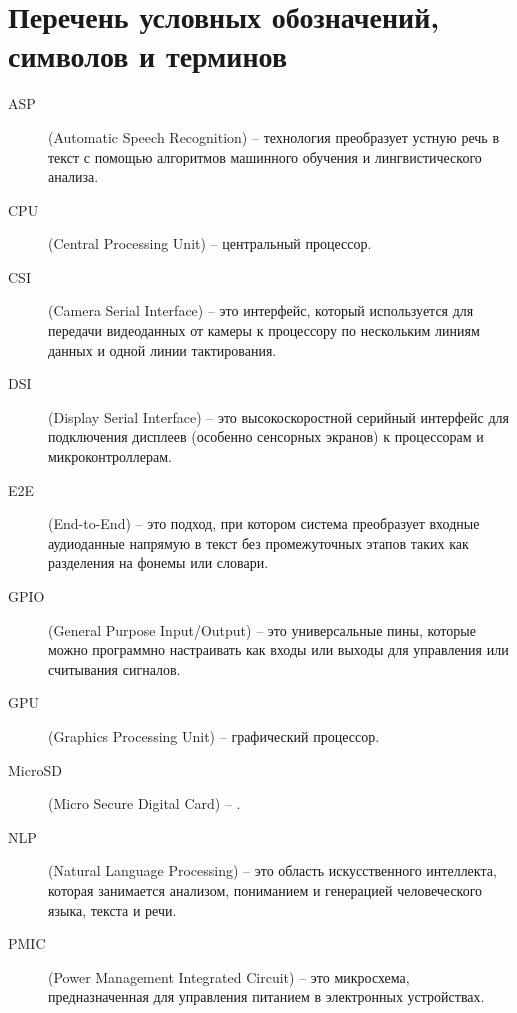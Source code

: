 \section*{Перечень условных обозначений, символов и терминов}




\begin{description}
	\item[\normalfont ASP] (Automatic Speech Recognition) -- технология преобразует устную речь в текст с помощью алгоритмов машинного обучения и лингвистического анализа.
	
	\item[\normalfont CPU] (Central Processing Unit) -- центральный процессор.
	
	\item[\normalfont CSI] (Camera Serial Interface) -- это интерфейс, который используется для передачи видеоданных от камеры к процессору по нескольким линиям данных и одной линии тактирования.
	
	\item[\normalfont DSI] (Display Serial Interface) -- это высокоскоростной серийный интерфейс для подключения дисплеев (особенно сенсорных экранов) к процессорам и микроконтроллерам.
	
	\item[\normalfont E2E] (End-to-End) -- это подход, при котором система преобразует входные аудиоданные напрямую в текст без промежуточных этапов таких как разделения на фонемы или словари.
	
	\item[\normalfont GPIO] (General Purpose Input/Output) -- это универсальные пины, которые можно программно настраивать как входы или выходы для управления или считывания сигналов.
	
	\item[\normalfont GPU] (Graphics Processing Unit) -- графический процессор.
	
	\item[\normalfont MicroSD] (Micro Secure Digital Card) -- .
	
	\item[\normalfont NLP] (Natural Language Processing) -- это область искусственного интеллекта, которая занимается анализом, пониманием и генерацией человеческого языка, текста и речи.
	
	\item[\normalfont PMIC] (Power Management Integrated Circuit) -- это микросхема, предназначенная для управления питанием в электронных устройствах.
	

\end{description}
